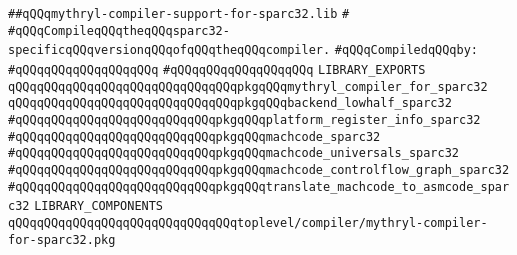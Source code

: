 \label{src/lib/compiler/mythryl-compiler-support-for-sparc32.lib}
\verb|##qQQqmythryl-compiler-support-for-sparc32.lib|\newline
\verb|#|\newline
\verb|#qQQqCompileqQQqtheqQQqsparc32-specificqQQqversionqQQqofqQQqtheqQQqcompiler.|\newline
\newline
\verb|#qQQqCompiledqQQqby:|\newline
\verb|#qQQqqQQqqQQqqQQqqQQq|\newline
\verb|#qQQqqQQqqQQqqQQqqQQq|\newline
\newline
\newline
\newline
\newline
\newline
\newline
\verb|LIBRARY_EXPORTS|\newline
\newline
\verb|qQQqqQQqqQQqqQQqqQQqqQQqqQQqqQQqpkgqQQqmythryl_compiler_for_sparc32|\newline
\newline
\verb|qQQqqQQqqQQqqQQqqQQqqQQqqQQqqQQqpkgqQQqbackend_lowhalf_sparc32|\newline
\verb|#qQQqqQQqqQQqqQQqqQQqqQQqqQQqpkgqQQqplatform_register_info_sparc32|\newline
\verb|#qQQqqQQqqQQqqQQqqQQqqQQqqQQqpkgqQQqmachcode_sparc32|\newline
\verb|#qQQqqQQqqQQqqQQqqQQqqQQqqQQqpkgqQQqmachcode_universals_sparc32|\newline
\verb|#qQQqqQQqqQQqqQQqqQQqqQQqqQQqpkgqQQqmachcode_controlflow_graph_sparc32|\newline
\verb|#qQQqqQQqqQQqqQQqqQQqqQQqqQQqpkgqQQqtranslate_machcode_to_asmcode_sparc32|\newline
\newline
\newline
\newline
\verb|LIBRARY_COMPONENTS|\newline
\newline
\verb|qQQqqQQqqQQqqQQqqQQqqQQqqQQqqQQqtoplevel/compiler/mythryl-compiler-for-sparc32.pkg|\newline
